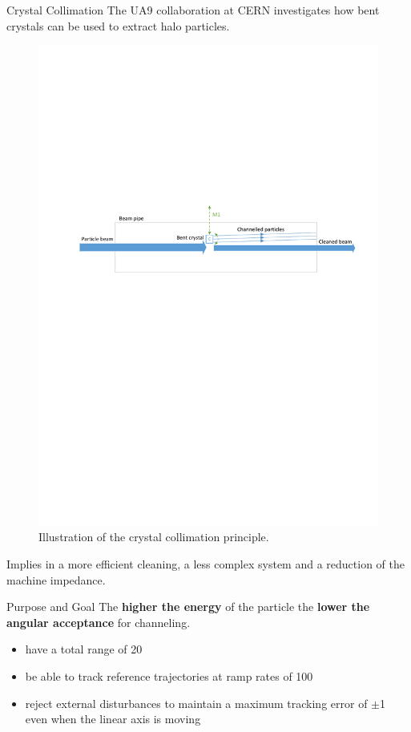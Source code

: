 \documentclass[10pt]{beamer}
\begin{document}
\begin{frame}[fragile]{Crystal Collimation}
  The UA9 collaboration at CERN investigates how bent crystals can be used to extract halo particles.

  \begin{figure}[h!]
    \centering %
    \includegraphics[width=1\textwidth, trim= 2cm 15.5cm 1cm 10cm, clip=true]{../fig/matlab/collimation}
    \caption{\label{fig:collimation}Illustration of the crystal collimation principle.}
  \end{figure}

  Implies in a more efficient cleaning, a less complex system and a reduction of the machine impedance.
\end{frame}


\begin{frame}[fragile]{Purpose and Goal}
  The \textbf{ higher the energy} of the particle the \textbf{lower the angular acceptance} for channeling.
  \begin{itemize}
    \item have a total range of \unit{20}{\milli\rad}
    \item be able to track reference trajectories at ramp rates of \unit{100}{\micro\radianpersecond}
    \item reject external disturbances to maintain a maximum tracking error of $\pm$\unit{1}{\micro\rad} even when the linear axis is moving
  \end{itemize}
\end{frame}
\end{document}
